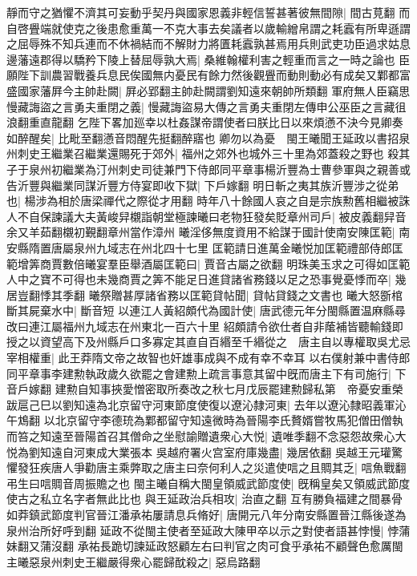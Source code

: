 靜而守之猶懼不濟其可妄動乎契丹與國家恩義非輕信誓甚著彼無間隙|{
	間古莧翻}
而自啓舋端就使克之後患愈重萬一不克大事去矣議者以歲輸繒帛謂之耗蠧有所卑遜謂之屈辱殊不知兵連而不休禍結而不解財力將匱耗蠧孰甚焉用兵則武吏功臣過求姑息邊藩遠郡得以驕矜下陵上替屈辱孰大焉|{
	桑維翰權利害之輕重而言之一時之論也}
臣願陛下訓農習戰養兵息民俟國無内憂民有餘力然後觀舋而動則動必有成矣又鄴都富盛國家藩屛今主帥赴闕|{
	屛必郢翻主帥赴闕謂劉知遠來朝帥所類翻}
軍府無人臣竊思慢藏誨盜之言勇夫重閉之義|{
	慢藏誨盜易大傳之言勇夫重閉左傳申公巫臣之言藏徂浪翻重直龍翻}
乞陛下畧加廵幸以杜姦謀帝謂使者曰朕比日以來煩懣不決今見卿奏如醉醒矣|{
	比毗至翻懣音悶醒先挺翻醉寤也}
卿勿以為憂　閩王曦聞王延政以書招泉州刺史王繼業召繼業還賜死于郊外|{
	福州之郊外也城外三十里為郊蓋殺之野也}
殺其子于泉州初繼業為汀州刺史司徒兼門下侍郎同平章事楊沂豐為士曹參軍與之親善或告沂豐與繼業同謀沂豐方侍宴即收下獄|{
	下戶嫁翻}
明日斬之夷其族沂豐涉之從弟也|{
	楊涉為相於唐梁禪代之際從才用翻}
時年八十餘國人哀之自是宗族勲舊相繼被誅人不自保諫議大夫黃峻舁櫬詣朝堂極諫曦曰老物狂發矣貶章州司戶|{
	被皮義翻舁音余又羊茹翻櫬初覲翻章州當作漳州}
曦淫侈無度資用不給謀于國計使南安陳匡範|{
	南安縣隋置唐屬泉州九域志在州北四十七里}
匡範請日進萬金曦悦加匡範禮部侍郎匡範增筭商賈數倍曦宴羣臣舉酒屬匡範曰|{
	賈音古屬之欲翻}
明珠美玉求之可得如匡範人中之寶不可得也未幾商賈之筭不能足日進貸諸省務錢以足之恐事覺憂悸而卒|{
	幾居豈翻悸其季翻}
曦祭贈甚厚諸省務以匡範貸帖聞|{
	貸帖貸錢之文書也}
曦大怒斵棺斷其屍棄水中|{
	斷音短}
以連江人黃紹頗代為國計使|{
	唐武德元年分閩縣置温麻縣尋改曰連江屬福州九域志在州東北一百六十里}
紹頗請令欲仕者自非䕃補皆聽輸錢即授之以資望高下及州縣戶口多寡定其直自百緡至千緡從之　唐主自以專權取吳尤忌宰相權重|{
	此王莽隋文帝之故智也奸雄事成與不成有幸不幸耳}
以右僕射兼中書侍郎同平章事李建勲執政歲久欲罷之會建勲上疏言事意其留中旣而唐主下有司施行|{
	下音戶嫁翻}
建勲自知事挾愛憎密取所奏改之秋七月戊辰罷建勲歸私第　帝憂安重榮跋扈己巳以劉知遠為北京留守河東節度使復以遼沁隸河東|{
	去年以遼沁隸昭義軍沁午鴆翻}
以北京留守李德珫為鄴都留守知遠微時為晉陽李氏贅婿嘗牧馬犯僧田僧執而笞之知遠至晉陽首召其僧命之坐慰諭贈遺衆心大悦|{
	遺唯季翻不念惡怨故衆心大悦為劉知遠自河東成大業張本}
吳越府署火宫室府庫幾盡|{
	幾居依翻}
吳越王元瓘驚懼發狂疾唐人爭勸唐主乘弊取之唐主曰奈何利人之災遣使唁之且賙其乏|{
	唁魚戰翻弔生曰唁賙音周振贍之也}
閩主曦自稱大閩皇領威武節度使|{
	旣稱皇矣又領威武節度使古之私立名字者無此比也}
與王延政治兵相攻|{
	治直之翻}
互有勝負福建之間暴骨如莽鎮武節度判官晉江潘承祐屢請息兵脩好|{
	唐開元八年分南安縣置晉江縣後遂為泉州治所好呼到翻}
延政不從閩主使者至延政大陳甲卒以示之對使者語甚悖慢|{
	悖蒲妹翻又蒲沒翻}
承祐長跪切諫延政怒顧左右曰判官之肉可食乎承祐不顧聲色愈厲閩主曦惡泉州刺史王繼嚴得衆心罷歸酖殺之|{
	惡烏路翻}
